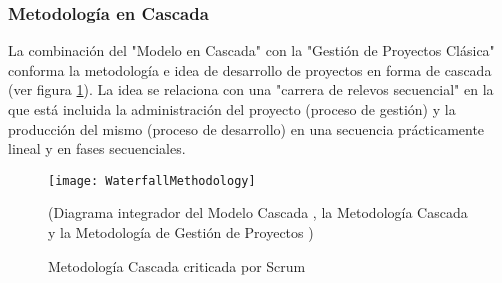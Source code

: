 \subsubsection{Metodología en Cascada}

La combinación del "Modelo en Cascada" con la "Gestión de Proyectos Clásica" conforma la metodología e idea de desarrollo de proyectos en forma de cascada (ver figura \ref{fig:WaterfallMethodology}). La idea se relaciona con una "carrera de relevos secuencial" en la que está incluida la administración del proyecto (proceso de gestión) y la producción del mismo (proceso de desarrollo) en una secuencia prácticamente lineal y en fases secuenciales.

\begin{figure}[h]
  \centering
  \texttt{[image: WaterfallMethodology]}
  \caption{Metodología Cascada criticada por Scrum}
  (Diagrama integrador del Modelo Cascada \cite{Winston-Royce-1970}, la Metodología Cascada \cite{Ken-Schwaber-1995} y la Metodología de Gestión de Proyectos \cite{PMBOK-1996})
  \centering
  \label{fig:WaterfallMethodology} %
\end{figure}
